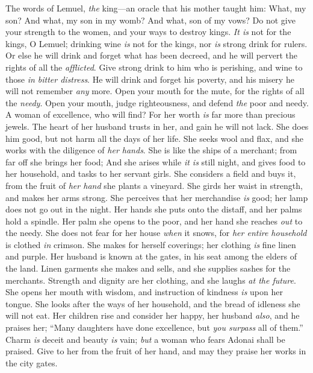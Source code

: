 \begin{biblechapter} %
 The words of Lemuel, \textit{the} king—an oracle 
that his mother taught him:
\verse What, my son? And what, my son in my womb? 
And what, son of my vows?
\verse Do not give your strength to the women, 
and your ways to destroy kings.
\verse \textit{It is} not for the kings, O Lemuel; 
drinking wine \textit{is} not for the kings, 
nor \textit{is} strong drink for rulers.
\verse Or else he will drink and forget what has been decreed, 
and he will pervert the rights of all the \textit{afflicted}.
\verse Give strong drink to him who is perishing, 
and wine to those \textit{in bitter distress}.
\verse He will drink and forget his poverty, 
and his misery he will not remember \textit{any} more.
\verse Open your mouth for the mute, 
for the rights of all the \textit{needy}.
\verse Open your mouth, judge righteousness, 
and defend \textit{the} poor and needy.
 A woman of excellence, who will find? 
For her worth \textit{is} far more than precious jewels.
\verse The heart of her husband trusts in her, 
and gain he will not lack.
\verse She does him good, but not harm 
all the days of her life.
\verse She seeks wool and flax, 
and she works with the diligence of \textit{her hands}.
\verse She is like the ships of a merchant; 
from far off she brings her food;
\verse And she arises while \textit{it is} still night, 
and gives food to her household, 
and tasks to her servant girls.
\verse She considers a field and buys it, 
from the fruit of \textit{her hand} she plants a vineyard.
\verse She girds her waist in strength, 
and makes her arms strong.
\verse She perceives that her merchandise \textit{is} good; 
her lamp does not go out in the night.
\verse Her hands she puts onto the distaff, 
and her palms hold a spindle.
\verse Her palm she opens to the poor, 
and her hand she reaches \textit{out} to the needy.
\verse She does not fear for her house \textit{when} it snows, 
for \textit{her entire household} is clothed \textit{in} crimson.
\verse She makes for herself coverings; 
her clothing \textit{is} fine linen and purple.
\verse Her husband is known at the gates, 
in his seat among the elders of the land.
\verse Linen garments she makes and sells, 
and she supplies sashes for the merchants.
\verse Strength and dignity are her clothing, 
and she laughs \textit{at the future}.
\verse She opens her mouth with wisdom, 
and instruction of kindness \textit{is} upon her tongue.
\verse She looks after the ways of her household, 
and the bread of idleness she will not eat.
\verse Her children rise and consider her happy, 
her husband \textit{also}, and he praises her;
\verse “Many daughters have done excellence, 
but \textit{you surpass} all of them.”
\verse Charm \textit{is} deceit and beauty \textit{is} vain; 
\textit{but} a woman who fears Adonai shall be praised.
\verse Give to her from the fruit of her hand, 
and may they praise her works in the city gates.
\end{biblechapter}

